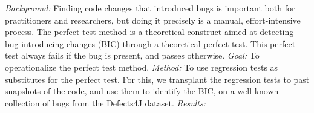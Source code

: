 

\textit{Background:}
Finding code changes that introduced bugs is important both for practitioners and researchers, but doing it precisely is a manual, effort-intensive process. The \underline{perfect test method} is a theoretical construct aimed at detecting bug-introducing changes (BIC) through a theoretical perfect test. This perfect test always fails if the bug is present, and passes otherwise.
\textit{Goal:}
To operationalize the perfect test method.
\textit{Method:}
To use regression tests as substitutes for the perfect test. 
For this, we transplant the regression tests to past snapshots of the code, and use them to identify the BIC, on a well-known collection of bugs from the Defects4J dataset. 
\textit{Results:}
